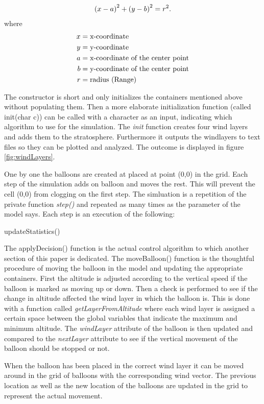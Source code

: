 \begin{align}
    \left(x - a \right)^2 + \left( y - b \right)^2=r^2.\notag
\end{align}
where
\begin{align}\notag
     		x &= \text{x-coordinate}\\\notag
				y &= \text{y-coordinate}\\\notag
				a &= \text{x-coordinate of the center point}\\\notag
				b &= \text{y-coordinate of the center point}\\\notag
				r &= \text{radius (Range)}\notag
\end{align}


The constructor is short and only initializes the containers mentioned above without populating them. Then a more elaborate initialization function (called init(char c)) can be called with a character as an input, indicating which algorithm to use for the simulation. The \textit{init} function creates four wind layers and adds them to the stratosphere. Furthermore it outputs the windlayers to text files so they can be plotted and analyzed. The outcome is displayed in figure \ref{fig:windLayers}. 

One by one the balloons are created at placed at point (0,0) in the grid. Each step of the simulation adds on balloon and moves the rest. This will prevent the cell (0,0) from clogging on the first step.
The simluation is a repetition of the private function \textit{step()} and repeated as many times as the parameter of the model says. Each step is an execution of the following:

\begin{algorithm}[H]



updateStatistics()
\end{algorithm}

The applyDecision() function is the actual control algorithm to which another section of this paper is dedicated. The moveBalloon() function is the thoughtful procedure of moving the balloon in the model and updating the appropriate containers. First the altitude is adjusted according to the vertical speed if the balloon is marked as moving up or down. Then a check is performed to see if the change in altitude affected the wind layer in which the balloon is. This is done with a function called \textit{getLayerFromAltitude} where each wind layer is assigned a certain space between the global variables that indicate the maximum and minimum altitude. The \textit{windLayer} attribute of the balloon is then updated and compared to the \textit{nextLayer} attribute to see if the vertical movement of the balloon should be stopped or not. 

When the balloon has been placed in the correct wind layer it can be moved around in the grid of balloons with the corresponding wind vector. The previous location as well as the new location of the balloons are updated in the grid to represent the actual movement. 